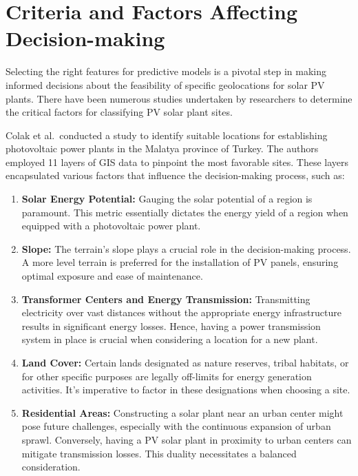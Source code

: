 \documentclass[a4paper,12pt]{Classes/RoboticsLaTeX}
\begin{document}
	\section{Criteria and Factors Affecting Decision-making}

	Selecting the right features for predictive models is a pivotal step in making informed decisions about the feasibility of specific geolocations for solar \ac{PV} plants. There have been numerous studies undertaken by researchers to determine the critical factors for classifying \ac{PV} solar plant sites.

	Colak et al.\ conducted a study to identify suitable locations for establishing photovoltaic power plants in the Malatya province of Turkey\cite{colak2020}. The authors employed 11 layers of GIS data to pinpoint the most favorable sites. These layers encapsulated various factors that influence the decision-making process, such as:

	\begin{enumerate}
		\item \textbf{Solar Energy Potential:} Gauging the solar potential of a region is paramount. This metric essentially dictates the energy yield of a region when equipped with a photovoltaic power plant.
		
		\item \textbf{Slope:} The terrain's slope plays a crucial role in the decision-making process. A more level terrain is preferred for the installation of \ac{PV} panels, ensuring optimal exposure and ease of maintenance.
		
		\item \textbf{Transformer Centers and Energy Transmission:} Transmitting electricity over vast distances without the appropriate energy infrastructure results in significant energy losses. Hence, having a power transmission system in place is crucial when considering a location for a new plant.
		
		\item \textbf{Land Cover:} Certain lands designated as nature reserves, tribal habitats, or for other specific purposes are legally off-limits for energy generation activities. It's imperative to factor in these designations when choosing a site.
		
		\item \textbf{Residential Areas:} Constructing a solar plant near an urban center might pose future challenges, especially with the continuous expansion of urban sprawl. Conversely, having a \ac{PV} solar plant in proximity to urban centers can mitigate transmission losses. This duality necessitates a balanced consideration.
	\end{enumerate}
\end{document}
